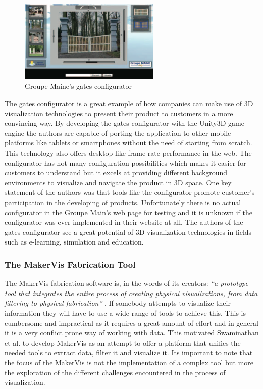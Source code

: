 \documentclass[../medieninformatik-arbeit.tex]{subfiles}
\begin{document}
\begin{figure}[hb]
\begin{center}
  \includegraphics[width=0.6\textwidth]{RelatedWork/img/gates-config}
  \caption{Groupe Maine's gates configurator \cite{rolland2012commerce} }
\label{fig:gates-config}
\end{center}
\end{figure}

The gates configurator is a great example of how companies can make use of 3D visualization technologies to present their product to customers in a more convincing way. By developing the gates configurator with the Unity3D game engine the authors are capable of porting the application to other mobile platforms like tablets or smartphones without the need of starting from scratch. This technology also offers desktop like frame rate performance in the web. The configurator has not many configuration possibilities which makes it easier for customers to understand but it excels at providing different background environments to visualize and navigate the product in 3D space. One key statement of the authors was that tools like the configurator promote customer's participation in the developing of products. Unfortunately there is no actual configurator in the Groupe Main's web page for testing and it is unknown if the configurator was ever implemented in their website at all. The authors of the gates configurator see a great potential of 3D visualization technologies in fields such as e-learning, simulation and education.

\subsubsection{The MakerVis Fabrication Tool}
The MakerVis fabrication software is, in the words of its creators: \textit{``a prototype tool that integrates the entire process of creating physical visualizations, from data filtering to physical fabrication''} \cite{swaminathan2014supporting}. If somebody attempts to visualize their information they will have to use a wide range of tools to achieve this. This is cumbersome and impractical as it requires a great amount of effort and in general it is a very conflict prone way of working with data. This motivated Swaminathan et al. to develop MakerVis as an attempt to offer a platform that unifies the needed tools to extract data, filter it and visualize it. Its important to note that the focus of the MakerVis is not the implementation of a complex tool but more the exploration of the different challenges encountered in the process of visualization.
\end{document}
